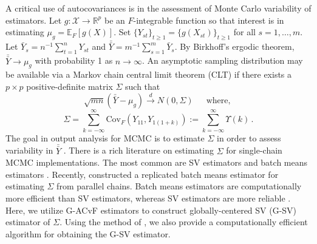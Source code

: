 \documentclass[11pt]{article}
\newcommand{\Cov}{\text{Cov}}
\newcommand{\X}{\mathcal{X}}
\theoremstyle{remark}
\begin{document}
A critical use of autocovariances is in the assessment of Monte Carlo variability of estimators.  Let $g:\X \to \mathbb{R}^p$ be an $F$-integrable function so that interest is in estimating
$\mu_g = \mathbb{E}_F[g(X)]$.
Set $\{Y_{st}\}_{t \geq 1} = \{g(X_{st})\}_{t \geq 1}$ for all $s = 1, \dots, m$. Let $\bar{Y}_s = n^{-1}\sum_{t=1}^{n}Y_{st}$  and  $\bar{\bar{Y}} = m^{-1}\sum_{s=1}^{m}\bar{Y}_s$. By Birkhoff's ergodic theorem,  $\bar{\bar{Y}} \to \mu_g$ with probability 1 as $n \to \infty$. An asymptotic sampling distribution may be available via a Markov chain central limit theorem (CLT) if there exists a $p \times p$ positive-definite matrix $\Sigma$ such that
%
\begin{equation}
\label{eq:CLT}
  \sqrt{mn}(\bar{\bar{Y}} - \mu_g) \xrightarrow{d} N(0,\Sigma)\, \quad \text{ where, }
\end{equation}
\begin{equation}
\label{eq:sigma}
  \Sigma = \sum_{k = -\infty}^{\infty} \Cov_F \left( Y_{11}, Y_{1(1+k)} \right) := \sum_{k = -\infty}^{\infty}\Upsilon (k)\,.
\end{equation}
%
The goal in output analysis for MCMC is to estimate $\Sigma$ in order to assess variability in $\bar{\bar{Y}}$ \citep{fleg:hara:jone:2008,roy:2019,vats:rob:fle:jon:2020}. There is a rich literature on estimating $\Sigma$ for single-chain MCMC implementations. The most common are SV estimators \citep{andr:1991,vats:fleg:jon:2018} and batch means estimators \citep{chen:seila:1987,vats:fleg:jon:2019}. Recently, \cite{gupta:vats:2020} constructed a replicated batch means estimator for estimating $\Sigma$ from parallel chains. Batch means estimators are computationally more efficient than SV estimators, whereas SV estimators are more reliable \citep{damerdji:1995,fleg:jone:2010}. Here, we utilize G-ACvF estimators to construct globally-centered SV (G-SV) estimator of $\Sigma$. Using the method of \cite{heberle2017fast}, we also provide a computationally efficient algorithm for obtaining the G-SV estimator. 
\end{document}
